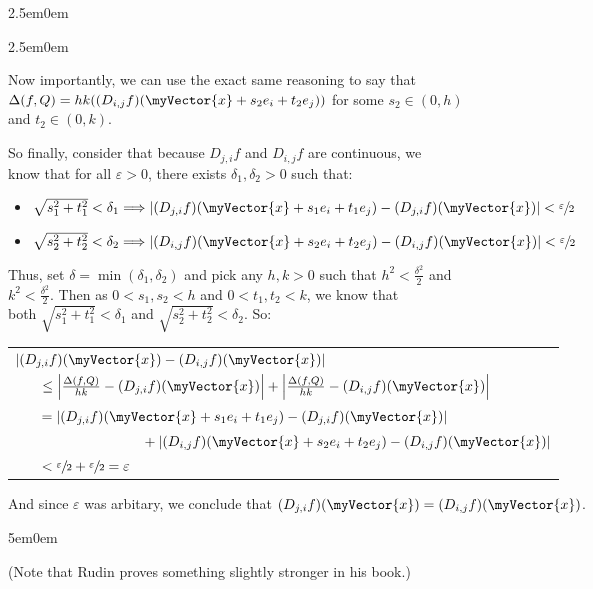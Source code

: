 \documentclass{book}
\newcommand{\myComment}{%
   \color{RawerSienna}%
   \fontsize{12}{14}\selectfont%
}
\newenvironment{myIndent}{%
   \begin{adjustwidth}{2.5em}{0em}%
}{%
   \end{adjustwidth}%
}
\newenvironment{myDindent}{%
   \begin{adjustwidth}{5em}{0em}%
}{%
   \end{adjustwidth}%
}
\newcommand{\retTwo}{\hfill\bigbreak}
\newcommand{\mVec}[1]{\myVector{#1}}
\begin{document}
{\begin{myIndent}
\begin{myIndent}
      Now importantly,  we can use the exact same reasoning to say that\\ $\Delta(f, Q) = hk((D_{i,j}f)(\mVec{x} + s_2e_i + t_2e_j))$ for some $s_2 \in (0, h)$\\ and $t_2 \in (0, k)$.\retTwo

      So finally, consider that because $D_{j,i}f$ and $D_{i,j}f$ are continuous, we\\ know that for all $\varepsilon > 0$, there exists $\delta_1, \delta_2 > 0$ such that:
      \begin{itemize}
         \item {\fontsize{12}{14} $\sqrt{s_1^2 + t_1^2} < \delta_1 \Longrightarrow \left|(D_{j,i}f)(\mVec{x} + s_1e_i + t_1e_j) - (D_{j,i}f)(\mVec{x})\right| < \sfrac{\varepsilon}{2}$}
         \item {\fontsize{12}{14} $\sqrt{s_2^2 + t_2^2} < \delta_2 \Longrightarrow \left|(D_{i,j}f)(\mVec{x} + s_2e_i + t_2e_j) - (D_{i,j}f)(\mVec{x})\right| < \sfrac{\varepsilon}{2}$}
      \end{itemize}\retTwo

      Thus, set $\delta = \min(\delta_1, \delta_2)$ and pick any $h, k > 0$ such that $h^2 < \frac{\delta^2}{2}$ and\\ $k^2 < \frac{\delta^2}{2}$. Then as $0 < s_1, s_2 < h$ and $0 < t_1, t_2 < k$, we know that\\ both $\sqrt{s_1^2 + t_1^2} < \delta_1$ and $\sqrt{s_2^2 + t_2^2} < \delta_2$. So:\\ 

      \begin{center}{\fontsize{11}{13}\selectfont}
         \begin{tabular}{l}
            $|(D_{j,i}f)(\mVec{x}) - (D_{i,j}f)(\mVec{x})|$\\ [6pt]
            $\phantom{aaa} \leq \left|\frac{\Delta(f, Q)}{hk} - (D_{j,i}f)(\mVec{x})\right| + \left|\frac{\Delta(f, Q)}{hk} - (D_{i,j}f)(\mVec{x})\right|$\\ [6pt]
            $\phantom{aaa} = \left|(D_{j,i}f)(\mVec{x} + s_1e_i + t_1e_j) - (D_{j,i}f)(\mVec{x})\right|$\\ [2pt]
            $\phantom{aaaaaaaaaaaaaaaaa} + \left|(D_{i,j}f)(\mVec{x} + s_2e_i + t_2e_j) - (D_{i,j}f)(\mVec{x})\right|$\\
            $\phantom{aaa} < \sfrac{\varepsilon}{2} + \sfrac{\varepsilon}{2} = \varepsilon$
         \end{tabular}\retTwo
      \end{center}

      And since $\varepsilon$ was arbitary, we conclude that $(D_{j,i}f)(\mVec{x}) = (D_{i,j}f)(\mVec{x})$.
      {\begin{myDindent}\myComment
         (Note that Rudin proves something slightly stronger in his book.)
      \end{myDindent}}
   \end{myIndent}
\end{myIndent}}
\end{document}
